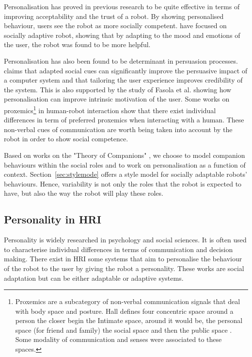 \documentclass[smallextended]{svjour3}
\begin{document}
Personalisation has proved in previous research to be quite effective in terms of improving acceptability and the trust of a robot. 
By showing personalised behaviour, users see the robot as more socially competent.
\cite{Kuhnlenz2013} have focused on socially adaptive robot, showing that by adapting to the mood and emotions of the user, the robot was found to be more helpful.

Personalisation has also been found to be determinant in persuasion processes. 
\cite{Fogg} claims that adapted social cues can significantly improve the persuasive impact of a computer system and that tailoring the user experience improves credibility of the system. 
This is also supported by the study of Fasola et al. \cite{Fasola2012} showing how personalisation can improve intrinsic motivation of the user. 
Some works on proxemics\footnote{Proxemics are a subcategory of non-verbal communication signals that deal with body space and posture. Hall defines four concentric space around a person the closer begin the Intimate space, around it would be, the personal space (for friend and family) the social space and then the public space \cite{hall1966}. Some modality of communication and senses were associated to these spaces.} \cite{Syrdal2007} in human-robot interaction show that there exist individual differences in term of preferred proxemics when interacting with a human. 
These non-verbal cues of communication are worth being taken into account by the robot in order to show social competence. 


Based on works on the "Theory of Companions" \cite{Kramer2011}, we choose to model companion behaviours within the social roles and to work on personalisation as a function of context. 
Section~\ref{sec:stylemode} offers a style model for socially adaptable robots' behaviours.
Hence, variability is not only the roles that the robot is expected to have, but also the way the robot will play these roles.

\subsection{Personality in HRI}
Personality is widely researched in psychology and social sciences. It is often used to characterise individual differences in terms of communication and decision making. 
There exist in HRI some systems that aim to personalise the behaviour of the robot to the user by giving the robot a personality. 
These works are social adaptation but can be either adaptable or adaptive systems. 
\end{document}
